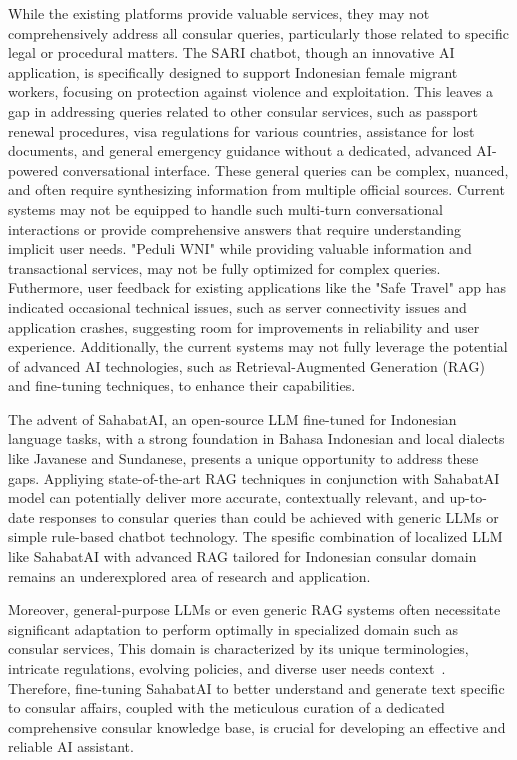 \documentclass[12pt]{report}
\begin{document}
While the existing platforms provide valuable services, they may not comprehensively address all consular queries, particularly those related to specific legal or procedural matters. The SARI chatbot, though an innovative AI application, is specifically designed to support Indonesian female migrant workers, focusing on protection against violence and exploitation. This leaves a gap in addressing queries related to other consular services, such as passport renewal procedures, visa regulations for various countries, assistance for lost documents, and general emergency guidance without a dedicated, advanced AI-powered conversational interface. These general queries can be complex, nuanced, and often require synthesizing information from multiple official sources. Current systems may not be equipped to handle such multi-turn conversational interactions or provide comprehensive answers that require understanding implicit user needs. "Peduli WNI" while providing valuable information and transactional services, may not be fully optimized for complex queries. Futhermore, user feedback for existing applications like the "Safe Travel" app has indicated occasional technical issues, such as server connectivity issues and application crashes, suggesting room for improvements in reliability and user experience. Additionally, the current systems may not fully leverage the potential of advanced AI technologies, such as Retrieval-Augmented Generation (RAG) and fine-tuning techniques, to enhance their capabilities.

The advent of SahabatAI, an open-source LLM fine-tuned for Indonesian language tasks, with a strong foundation in Bahasa Indonesian and local dialects like Javanese and Sundanese, presents a unique opportunity to address these gaps. Appliying state-of-the-art RAG techniques in conjunction with SahabatAI model can potentially deliver more accurate, contextually relevant, and up-to-date responses to consular queries than could be achieved with generic LLMs or simple rule-based chatbot technology. The spesific combination of localized LLM like SahabatAI with advanced RAG tailored for Indonesian consular domain remains an underexplored area of research and application.

Moreover, general-purpose LLMs or even generic RAG systems often necessitate significant adaptation to perform optimally in specialized domain such as consular services, This domain is characterized by its unique terminologies, intricate regulations, evolving policies, and diverse user needs context~\cite{karzhevdatacamp2025}. Therefore, fine-tuning SahabatAI to better understand and generate text specific to consular affairs, coupled with the meticulous curation of a dedicated comprehensive consular knowledge base, is crucial for developing an effective and reliable AI assistant.
\end{document}

